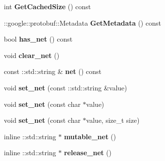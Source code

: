 \begin{DoxyCompactItemize}
int {\bfseries Get\+Cached\+Size} () const
\item 
\mbox{\label{classcaffe_1_1_solver_parameter_aa457d9a1af3197ed96f5f20d93279807}} 
\+::google\+::protobuf\+::\+Metadata {\bfseries Get\+Metadata} () const
\item 
\mbox{\label{classcaffe_1_1_solver_parameter_a4098b0ffb0a98835a92129e5b70c2162}} 
bool {\bfseries has\+\_\+net} () const
\item 
\mbox{\label{classcaffe_1_1_solver_parameter_af0b4d3556dd830df35d6dac24c181313}} 
void {\bfseries clear\+\_\+net} ()
\item 
\mbox{\label{classcaffe_1_1_solver_parameter_ae3e7f5ecb093e7d0758d297af9fdd094}} 
const \+::std\+::string \& {\bfseries net} () const
\item 
\mbox{\label{classcaffe_1_1_solver_parameter_ac5462be1fbf039b9b57c3ded6ee7c439}} 
void {\bfseries set\+\_\+net} (const \+::std\+::string \&value)
\item 
\mbox{\label{classcaffe_1_1_solver_parameter_a86a0475ed266802490f641164334d13d}} 
void {\bfseries set\+\_\+net} (const char $\ast$value)
\item 
\mbox{\label{classcaffe_1_1_solver_parameter_a671e0b93077c1246a82eaa5731c93246}} 
void {\bfseries set\+\_\+net} (const char $\ast$value, size\+\_\+t size)
\item 
\mbox{\label{classcaffe_1_1_solver_parameter_a730175f3895e9c896fd246c99d06dabd}} 
inline \+::std\+::string $\ast$ {\bfseries mutable\+\_\+net} ()
\item 
\mbox{\label{classcaffe_1_1_solver_parameter_a08f8845c5cdb3a079b87663567a4d0fc}} 
inline \+::std\+::string $\ast$ {\bfseries release\+\_\+net} ()
\item 
\mbox{\label{classcaffe_1_1_solver_parameter_a7d74b0ebd755c412f69edbf5cf7b2557}} 

\end{DoxyCompactItemize}
